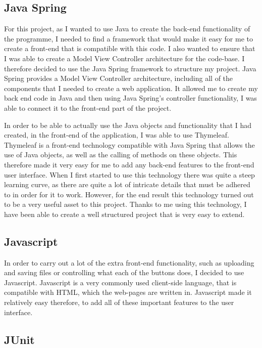 \subsection{Java Spring \label{JavaSpring}}

For this project, as I wanted to use Java to create the back-end functionality of the programme, I needed to find a framework that would make it easy for me to create a front-end that is compatible with this code. I also wanted to ensure that I was able to create a Model View Controller architecture for the code-base. I therefore decided to use the Java Spring framework to structure my project. Java Spring provides a Model View Controller architecture, including all of the components that I needed to create a web application. It allowed me to create my back end code in Java and then using Java Spring's controller functionality, I was able to connect it to the front-end part of the project. 

In order to be able to actually use the Java objects and functionality that I had created, in the front-end of the application, I was able to use Thymeleaf. Thymeleaf is a front-end technology compatible with Java Spring that allows the use of Java objects, as well as the calling of methods on these objects. This therefore made it very easy for me to add any back-end features to the front-end user interface. When I first started to use this technology there was quite a steep learning curve, as there are quite a lot of intricate details that must be adhered to in order for it to work. However, for the end result this technology turned out to be a very useful asset to this project. Thanks to me using this technology, I have been able to create a well structured project that is very easy to extend.


\subsection{Javascript}

In order to carry out a lot of the extra front-end functionality, such as uploading and saving files or controlling what each of the buttons does, I decided to use Javascript. Javascript is a very commonly used client-side language, that is compatible with HTML, which the web-pages are written in. Javascript made it relatively easy therefore, to add all of these important features to the user interface. 

\subsection{JUnit\label{JUnit}}


